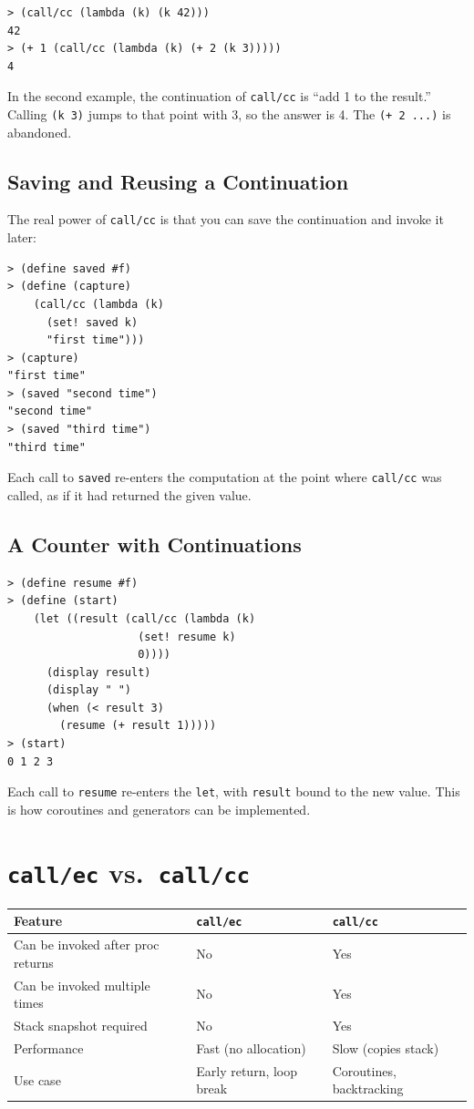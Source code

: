 \begin{lstlisting}[style=repl]
> (call/cc (lambda (k) (k 42)))
42
> (+ 1 (call/cc (lambda (k) (+ 2 (k 3)))))
4
\end{lstlisting}

In the second example, the continuation of \texttt{call/cc} is ``add 1 to the result.'' Calling \texttt{(k 3)} jumps to that point with 3, so the answer is 4. The \texttt{(+ 2 ...)} is abandoned.

\subsection{Saving and Reusing a Continuation}

The real power of \texttt{call/cc} is that you can save the continuation and invoke it later:

\begin{lstlisting}[style=repl]
> (define saved #f)
> (define (capture)
    (call/cc (lambda (k)
      (set! saved k)
      "first time")))
> (capture)
"first time"
> (saved "second time")
"second time"
> (saved "third time")
"third time"
\end{lstlisting}

Each call to \texttt{saved} re-enters the computation at the point where \texttt{call/cc} was called, as if it had returned the given value.

\subsection{A Counter with Continuations}

\begin{lstlisting}[style=repl]
> (define resume #f)
> (define (start)
    (let ((result (call/cc (lambda (k)
                    (set! resume k)
                    0))))
      (display result)
      (display " ")
      (when (< result 3)
        (resume (+ result 1)))))
> (start)
0 1 2 3
\end{lstlisting}

Each call to \texttt{resume} re-enters the \texttt{let}, with \texttt{result} bound to the new value. This is how coroutines and generators can be implemented.

\section{\texttt{call/ec} vs.\ \texttt{call/cc}}

\begin{center}
\begin{tabular}{lp{5cm}l}
\textbf{Feature} & \textbf{\texttt{call/ec}} & \textbf{\texttt{call/cc}} \\
\hline
Can be invoked after proc returns & No & Yes \\
Can be invoked multiple times & No & Yes \\
Stack snapshot required & No & Yes \\
Performance & Fast (no allocation) & Slow (copies stack) \\
Use case & Early return, loop break & Coroutines, backtracking \\
\end{tabular}
\end{center}

